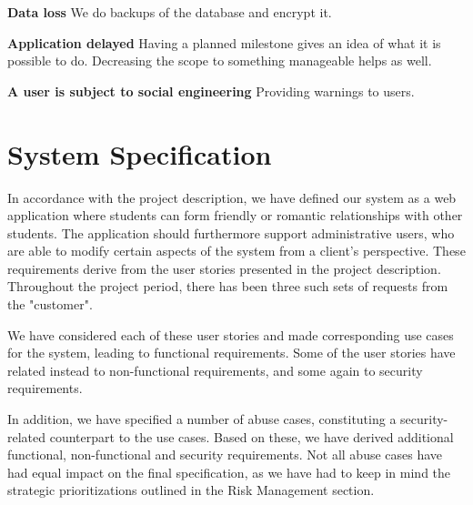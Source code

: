 \documentclass[a4paper]{article}
\begin{document}
\textbf{Data loss}
We do backups of the database and encrypt it.

\textbf{Application delayed}
Having a planned milestone gives an idea of what it is possible to do.
Decreasing the scope to something manageable helps as well.

\textbf{A user is subject to social engineering}
Providing warnings to users.


\section{System Specification}
In accordance with the project description, we have defined our system as a web application where students can form friendly or romantic relationships with other students. The application should furthermore support administrative users, who are able to modify certain aspects of the system from a client's perspective. These requirements derive from the user stories presented in the project description. Throughout the project period, there has been three such sets of requests from the "customer".

We have considered each of these user stories and made corresponding use cases for the system, leading to functional requirements. Some of the user stories have related instead to non-functional requirements, and some again to security requirements.

In addition, we have specified a number of abuse cases, constituting a security-related counterpart to the use cases. Based on these, we have derived additional functional, non-functional and security requirements. Not all abuse cases have had equal impact on the final specification, as we have had to keep in mind the strategic prioritizations outlined in the Risk Management section.
\end{document}
